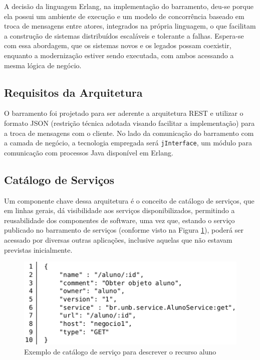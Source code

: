 A decisão da linguagem Erlang, na implementação do barramento, 
deu-se porque ela possui um ambiente de execução e um modelo de concorrência 
baseado em troca de mensagens entre atores, integrados na própria linguagem, o que facilitam 
a construção de sistemas distribuídos escaláveis e tolerante a falhas.
Espera-se com essa abordagem, que os sistemas novos e os legados possam coexistir, 
enquanto a modernização estiver sendo executada, com ambos acessando a mesma lógica de negócio. 


\subsection{Requisitos da Arquitetura}

O barramento foi projetado para ser aderente a arquitetura REST e utilizar o formato JSON (restrição técnica adotada visando facilitar a implementação) para a troca de mensagens com o cliente. No lado da comunicação do barramento com a camada de negócio, a tecnologia empregada será \texttt{jInterface}, um módulo para comunicação com processos Java disponível em Erlang.

\subsection{Catálogo de Serviços}

Um componente chave dessa arquitetura é o conceito de 
catálogo de serviços, que em linhas gerais, dá visibilidade aos serviços 
disponibilizados, permitindo a reusabilidade dos componentes de software, 
uma vez que, estando o serviço publicado no barramento de serviços (conforme 
visto na Figura \ref{fig:catalogo}), poderá ser acessado por diversas outras aplicações, inclusive aquelas que não estavam previstas inicialmente.


\begin{figure}[htb]
\includegraphics[scale=0.6]{figuras/catalogo.png}
\caption{Exemplo de catálogo de serviço para descrever o recurso aluno}
\label{fig:catalogo}
\end{figure}

